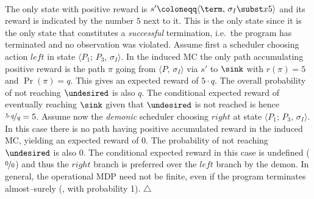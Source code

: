 \begin{example}
\begin{center}
{
 }\\
\end{center}
The only state with positive reward is $s' \coloneqq\langle\term,\,\sigma_I\subst x 5\rangle$ and its reward is indicated by the number $5$ next to it.
This is the only state since it is the only state that constitutes a \emph{successful} termination, i.e.\ the program has terminated and no observation was violated.
Assume first a scheduler choosing action $\mathit{left}$ in state $\langle P_1;\,P_3,\,\sigma_I\rangle$.
In the induced MC the only path accumulating positive reward is the path $\pi$ going from $\langle P,\, \sigma_I\rangle$ via
$s'$ to $\sink$ with $r(\pi)=5$ and $\Pr(\pi)=q$. 
This gives an expected reward of $5\cdot q$.
The overall probability of not reaching $\undesired$ is also $q$. 
The conditional expected reward of eventually reaching $\sink$ given that $\undesired$ is not reached is hence $\nicefrac{5\cdot q}{q}=5$. 
Assume now the \emph{demonic} scheduler choosing $\mathit{right}$ at state $\langle P_1;\,P_3,\,\sigma_I\rangle$. 
In this case there is no path having positive accumulated reward in the induced MC, yielding an expected reward of $0$. 
The probability of not reaching $\undesired$ is also $0$. 
The conditional expected reward in this case is undefined ($\nicefrac{0}{0}$) and thus the $\mathit{right}$ branch is preferred over the $\mathit{left}$ branch by the demon. 
In general, the operational MDP need not be finite, even if the program terminates almost--surely (\ie, with probability 1).
\hfill$\triangle$
\end{example}
\fi

